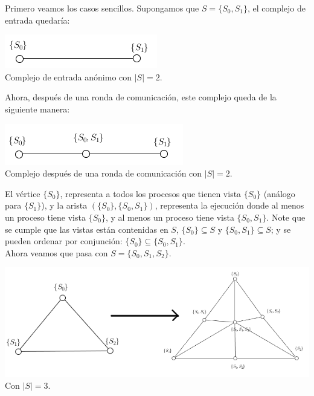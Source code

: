 \documentclass{article}
\begin{document}
\begin{enumerate}
{    Primero veamos los casos sencillos. Supongamos que $S = \{S_{0}, S_{1}\}$, el complejo de entrada
    quedaría:\\
    \begin{center}
      \includegraphics[scale=0.5]{input.png}
      \\Complejo de entrada anónimo con $|S| = 2$.
    \end{center}
    Ahora, después de una ronda de comunicación, este complejo queda de la siguiente manera:\\
    \begin{center}
      \includegraphics[scale=0.5]{input_1.png}
      \\Complejo después de una ronda de comunicación con $|S| = 2$.
    \end{center}
    El vértice $\{S_{0}\}$, representa a todos los procesos que tienen vista $\{S_{0}\}$ (análogo para $\{S_{1}\}$),
    y la arista $(\{S_{0}\}, \{S_{0},S_{1}\})$, representa la ejecución donde al menos un proceso tiene vista
    $\{S_{0}\}$, y al menos un proceso tiene vista $\{S_{0}, S_{1}\}$.
    Note que se cumple que las vistas están contenidas en $S$, $\{S_{0}\} \subseteq S$ y $\{S_{0},S_{1}\} \subseteq S$; y se pueden
    ordenar por conjunción: $\{S_{0}\} \subseteq \{S_{0},S_{1}\}$.\\
    Ahora veamos que pasa con $S = \{S_{0}, S_{1}, S_{2}\}$.\\
    \begin{center}
      \includegraphics[scale=0.5]{input_2.png}
      \\\tiny{Con $|S| = 3$.}
    \end{center}
}
\end{enumerate}
\end{document}
